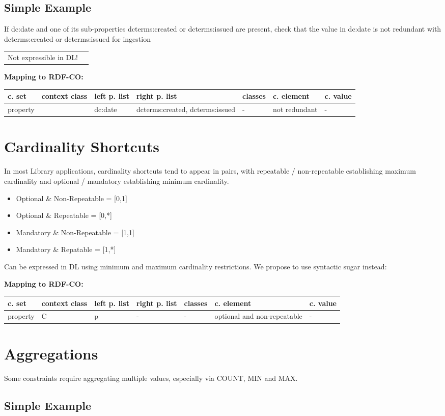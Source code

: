 \documentclass{llncs}
\newenvironment{gcotable}{
  \scriptsize
  \sffamily
  \vspace{0cm}
	\begin{center}
	\textbf{\vspace{0.4cm}Mapping to RDF-CO:} \\
  \begin{tabular}{l|l|l|l|l|l|l}
	\hline
  \textbf{c. set} & \textbf{context class} & \textbf{left p. list} & \textbf{right p. list} & \textbf{classes} & \textbf{c. element} & \textbf{c. value} \\
  \hline

}{
  \hline
  \end{tabular}
	\end{center}
}
\newenvironment{DL}{
\vspace{0cm}
	\begin{center}
  \begin{tabular}{r l}

}{
  \end{tabular}
	\end{center}
}
\begin{document}
\subsection{Simple Example}

If dc:date and one of its sub-properties dcterms:created or dcterms:issued are present, check that the value in dc:date is not redundant with dcterms:created or dcterms:issued for ingestion

\begin{DL}
Not expressible in DL!
\end{DL}

\begin{gcotable}
property &  & dc:date & dcterms:created, dcterms:issued & - & not redundant & - \\
\end{gcotable}

\section{Cardinality Shortcuts}

In most Library applications, cardinality shortcuts tend to appear in pairs, with repeatable / non-repeatable establishing maximum cardinality and optional / mandatory establishing minimum cardinality.
\begin{itemize}
	\item Optional \& Non-Repeatable = [0,1]
  \item Optional \& Repeatable = [0,*]
  \item Mandatory \& Non-Repeatable = [1,1]
  \item Mandatory \& Repatable = [1,*]
\end{itemize}
Can be expressed in DL using minimum and maximum cardinality restrictions.
We propose to use syntactic sugar instead:
\begin{gcotable}
property & C & p & - & - & optional and non-repeatable & - \\
\end{gcotable}

\section{Aggregations}

Some constraints require aggregating multiple values, especially via COUNT, MIN and MAX. 

\subsection{Simple Example}
\end{document}
